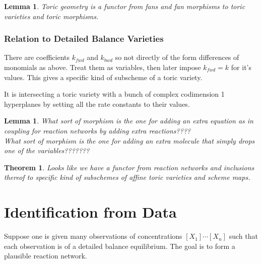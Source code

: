 \documentclass[11pt]{book}
\theoremstyle{change}
\newtheorem{thm}[equation]{Theorem}
\newtheorem{lemma}[equation]{Lemma}
\theoremstyle{nonumberplain}
\numberwithin{equation}{section}
\begin{document}
\begin{lemma}
Toric geometry is a functor from fans and fan morphisms to toric varieties and toric morphisms.
\end{lemma}

\subsubsection{Relation to Detailed Balance Varieties}

There are coefficients $k_{fwd}$ and $k_{bwd}$ so not directly of the form differences of monomials as above. Treat them as variables, then later impose $k_{fwd} = k$ for it's values. This gives a specific kind of subscheme of a toric variety.

It is intersecting a toric variety with a bunch of complex codimension 1 hyperplanes by setting all the rate constants to their values.

\begin{lemma}
What sort of morphism is the one for adding an extra equation as in coupling for reaction networks by adding extra reactions????\\
What sort of morphism is the one for adding an extra molecule that simply drops one of the variables???????\\
\end{lemma}

\begin{thm}
Looks like we have a functor from reaction networks and inclusions thereof to specific kind of subschemes of affine toric varieties and scheme maps.
\end{thm}

\section{Identification from Data}

Suppose one is given many observations of concentrations $[X_1] \cdots [X_n]$ such that each observation is of a detailed balance equilibrium. The goal is to form a plausible reaction network.
\end{document}

